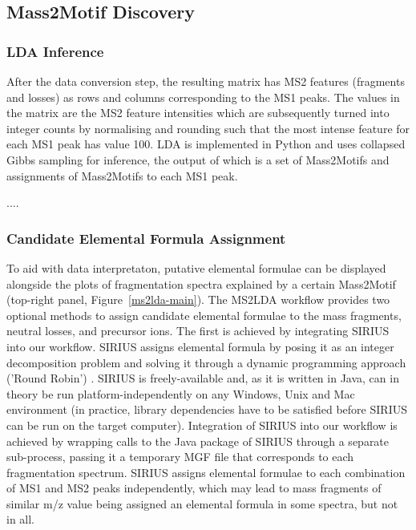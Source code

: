 \subsection{Mass2Motif Discovery\label{sub:topic-discovery}}

\subsubsection{LDA Inference}

After the data conversion step, the resulting matrix has MS2 features (fragments and losses) as rows and columns corresponding to the MS1 peaks. The values in the matrix are the MS2 feature intensities which are subsequently turned into integer counts by normalising and rounding such that the most intense feature for each MS1 peak has value 100. LDA is implemented in Python and uses collapsed Gibbs sampling for inference, the output of which is a set of Mass2Motifs and assignments of Mass2Motifs to each MS1 peak. 

....

\subsubsection{Candidate Elemental Formula Assignment}

To aid with data interpretaton, putative elemental formulae can be displayed alongside the plots of fragmentation spectra explained by a certain Mass2Motif (top-right panel, Figure~\ref{ms2lda-main}). The MS2LDA workflow provides two optional methods to assign candidate elemental formulae to the mass fragments, neutral losses, and precursor ions.  The first is achieved by integrating SIRIUS \cite{Bocker2009} into our workflow. SIRIUS assigns elemental formula by posing it as an integer decomposition problem and solving it through a dynamic programming approach ('Round Robin') \cite{Bocker2007}. SIRIUS is freely-available and, as it is written in Java, can in theory be run platform-independently on any Windows, Unix and Mac environment (in practice, library dependencies have to be satisfied before SIRIUS can be run on the target computer). Integration of SIRIUS into our workflow is achieved by wrapping calls to the Java package of SIRIUS through a separate sub-process, passing it a temporary MGF file that corresponds to each fragmentation spectrum. SIRIUS assigns elemental formulae to each combination of MS1 and MS2 peaks independently, which may lead to mass fragments of similar m/z value being assigned an elemental formula in some spectra, but not in all.

